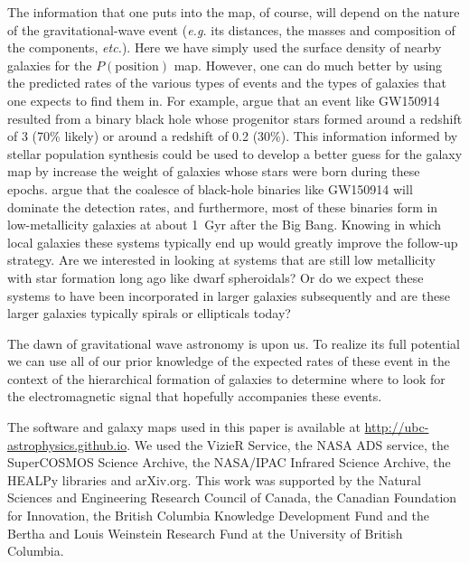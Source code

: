 \documentclass[useAMS,usenatbib]{mn2e}
\begin{document}
The information that one puts into the map, of course, will depend on
the nature of the gravitational-wave event ({\em e.g.} its distances,
the masses and composition of the components, {\em etc.}).  Here we
have simply used the surface density of nearby galaxies for the
$P(\mathrm{position})$ map.  However, one can do much better by using
the predicted rates of the various types of events and the types of
galaxies that one expects to find them in.  For example,
\citet{2016arXiv160204531B} argue that an event like GW150914 resulted
from a binary black hole whose progenitor stars formed around a
redshift of 3 (70\% likely) or around a redshift of 0.2 (30\%).  This
information informed by stellar population synthesis could be used to
develop a better guess for the galaxy map by increase the weight of
galaxies whose stars were born during these epochs.
\citet{2015ApJ...806..263D} argue that the coalesce of black-hole
binaries like GW150914 will dominate the detection rates, and
furthermore, most of these binaries form in low-metallicity galaxies
at about 1~Gyr after the Big Bang.  Knowing in which local galaxies
these systems typically end up would greatly improve the follow-up
strategy.  Are we interested in looking at systems that are still low
metallicity with star formation long ago like dwarf spheroidals?  Or
do we expect these systems to have been incorporated in larger galaxies
subsequently and are these larger galaxies typically spirals or
ellipticals today?

The dawn of gravitational wave astronomy is upon us.  To realize its
full potential we can use all of our prior knowledge of the expected
rates of these event in the context of the hierarchical formation of
galaxies to determine where to look for the electromagnetic signal
that hopefully accompanies these events.


The software and galaxy maps used in this paper is available at
\url{http://ubc-astrophysics.github.io}.  We used the VizieR Service,
the NASA ADS service, the SuperCOSMOS Science Archive, the NASA/IPAC
Infrared Science Archive, the HEALPy libraries and arXiv.org. This work
was supported by the Natural Sciences and Engineering Research Council
of Canada, the Canadian Foundation for Innovation, the British
Columbia Knowledge Development Fund and the Bertha and Louis Weinstein
Research Fund at the University of British Columbia.






\label{lastpage}
\end{document}
